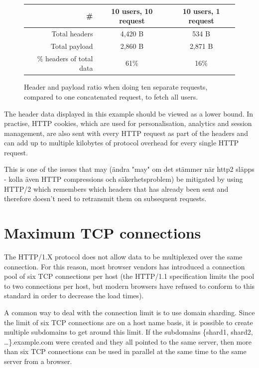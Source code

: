 \documentclass{cslthse-msc}
\begin{document}
\begin{figure}[H]
  \centering
    \begin{center}
      \begin{tabular}{ r | c | c }
        \textbf{\#} & \textbf{10 users, 10 request} & \textbf{10 users, 1 request} \\ \hline
        Total headers & 4,420 B & 534 B \\ \hline
        Total payload & 2,860 B & 2,871 B \\ \hline
        \% headers of total data & 61\% & 16\% \\ \hline
      \end{tabular}
    \end{center}
  \caption{Header and payload ratio when doing ten separate requests, compared to one concatenated request, to fetch all users.}
\end{figure}

The header data displayed in this example should be viewed as a lower bound. In practise, HTTP cookies, which are used for personalisation, analytics and session management, are also sent with every HTTP request as part of the headers and can add up to multiple kilobytes of protocol overhead for every single HTTP request\cite[page 200]{HPBN}.

This is one of the issues that may (ändra "may" om det stämmer när http2 släpps - kolla även HTTP compressions och säkerhetsproblem) be mitigated by using HTTP/2 which remembers which headers that has already been sent and therefore doesn't need to retransmit them on subsequent requests\cite[page 222]{HPBN}.

\section{Maximum TCP connections}
\label{max_tcp}
The HTTP/1.X protocol does not allow data to be multiplexed over the same connection\cite[p.194]{HPBN}. For this reason, most browser vendors has introduced a connection pool of six TCP connections per host (the HTTP/1.1 specification limits the pool to two connections\cite{rfc2616} per host, but modern browsers have refused to conform to this standard in order to decrease the load times).

A common way to deal with the connection limit is to use domain sharding. Since the limit of six TCP connections are on a host name basis, it is possible to create multiple subdomains to get around this limit. If the subdomains \{shard1, shard2, \ldots\}.example.com were created and they all pointed to the same server, then more than six TCP connections can be used in parallel at the same time to the same server from a browser. 
\end{document}
